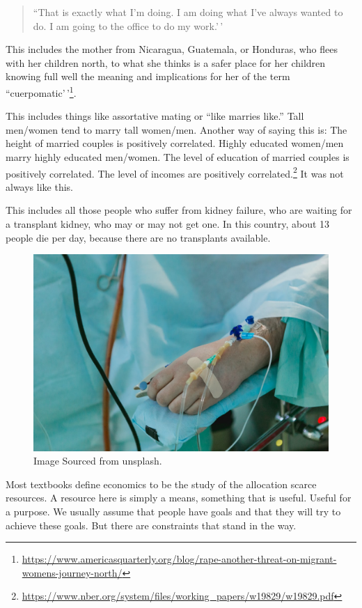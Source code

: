 \documentclass[
]{book}
\begin{document}
\begin{quote}
``That is exactly what I'm doing. I am doing what I've always wanted to do. I am going to the office to do my work.'\,'
\end{quote}

This includes the mother from Nicaragua, Guatemala, or Honduras, who flees with her children north, to what she thinks is a safer place for her children knowing full well the meaning and implications for her of the term ``cuerpomatic'\,'\footnote{\url{https://www.americasquarterly.org/blog/rape-another-threat-on-migrant-womens-journey-north/}}.

This includes things like assortative mating or ``like marries like.'' Tall men/women tend to marry tall women/men. Another way of saying this is: The height of married couples is positively correlated. Highly educated women/men marry highly educated men/women. The level of education of married couples is positively correlated. The level of incomes are positively correlated.\footnote{\url{https://www.nber.org/system/files/working_papers/w19829/w19829.pdf}} It was not always like this.

This includes all those people who suffer from kidney failure, who are waiting for a transplant kidney, who may or may not get one. In this country, about 13 people die per day, because there are no transplants available.

\begin{figure}

{\centering \includegraphics[width=0.5\linewidth]{img/intro/fig6} 

}

\caption{Image Sourced from unsplash.}\label{fig:intro06}
\end{figure}

Most textbooks define economics to be the study of the allocation scarce resources. A resource here is simply a means, something that is useful. Useful for a purpose. We usually assume that people have goals and that they will try to achieve these goals. But there are constraints that stand in the way.
\end{document}
